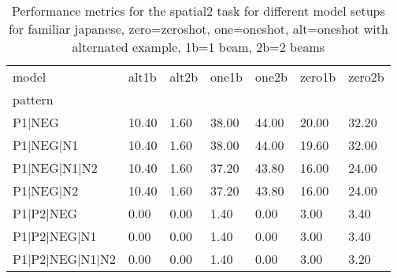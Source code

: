 \begin{table}[h]
\begin{tabular}{l|llllll}
\toprule
model & alt1b & alt2b & one1b & one2b & zero1b & zero2b \\
pattern &  &  &  &  &  &  \\
\midrule
P1|NEG & 10.40 & 1.60 & 38.00 & 44.00 & 20.00 & 32.20 \\
P1|NEG|N1 & 10.40 & 1.60 & 38.00 & 44.00 & 19.60 & 32.00 \\
P1|NEG|N1|N2 & 10.40 & 1.60 & 37.20 & 43.80 & 16.00 & 24.00 \\
P1|NEG|N2 & 10.40 & 1.60 & 37.20 & 43.80 & 16.00 & 24.00 \\
P1|P2|NEG & 0.00 & 0.00 & 1.40 & 0.00 & 3.00 & 3.40 \\
P1|P2|NEG|N1 & 0.00 & 0.00 & 1.40 & 0.00 & 3.00 & 3.40 \\
P1|P2|NEG|N1|N2 & 0.00 & 0.00 & 1.40 & 0.00 & 3.00 & 3.20 \\
\bottomrule
\end{tabular}
\caption{Performance metrics for the spatial2 task for different model setups for familiar japanese, zero=zeroshot, one=oneshot, alt=oneshot with alternated example, 1b=1 beam, 2b=2 beams}
\label{tab:ja fam_spatial2_performance}
\end{table}
